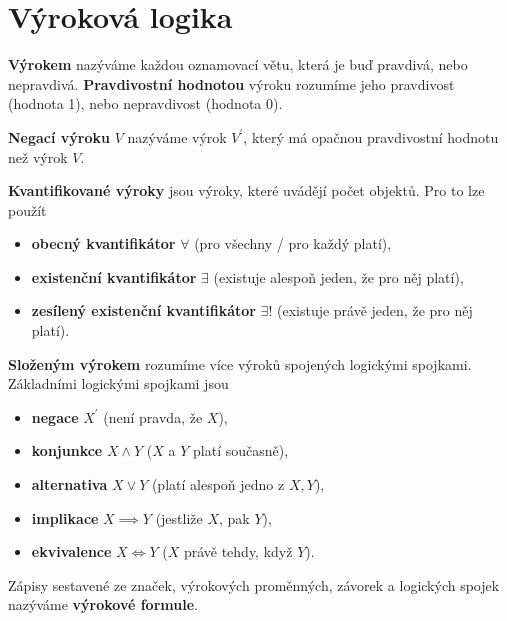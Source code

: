 \section{Výroková logika}
\begin{definition}
  \textbf{Výrokem} nazýváme každou oznamovací větu, která je buď pravdivá, nebo nepravdivá. \textbf{Pravdivostní hodnotou} výroku rozumíme jeho pravdivost (hodnota 1), nebo nepravdivost (hodnota 0).
\end{definition}

\begin{definition}
  \textbf{Negací výroku} $V$ nazýváme výrok $V^\prime$, který má opačnou pravdivostní hodnotu než výrok $V$.
\end{definition}

\begin{pozn}
  \textbf{Kvantifikované výroky} jsou výroky, které uvádějí počet objektů. Pro to lze použít
  \begin{itemize}
    \item \textbf{obecný kvantifikátor} $\forall$ (pro všechny / pro každý platí),
    \item \textbf{existenční kvantifikátor} $\exists$ (existuje alespoň jeden, že pro něj platí),
    \item \textbf{zesílený existenční kvantifikátor} $\exists !$ (existuje právě jeden, že pro něj platí).
  \end{itemize}
\end{pozn}

\begin{definition}
  \textbf{Složeným výrokem} rozumíme více výroků spojených logickými spojkami. Základními logickými spojkami jsou
  \begin{itemize}
	\item \textbf{negace} $X^\prime$ (není pravda, že $X$),
	\item \textbf{konjunkce} $X \land Y$ ($X$ a $Y$ platí současně),
	\item \textbf{alternativa} $X \lor Y$ (platí alespoň jedno z $X, Y$),
	\item \textbf{implikace} $X \implies Y$ (jestliže $X$, pak $Y$),
	\item \textbf{ekvivalence} $X \iff Y$ ($X$ právě tehdy, když $Y$).
  \end{itemize}
  \end{definition}

  \begin{definition}
    Zápisy sestavené ze značek, výrokových proměnných, závorek a logických spojek nazýváme \textbf{výrokové formule}.
  \end{definition}

